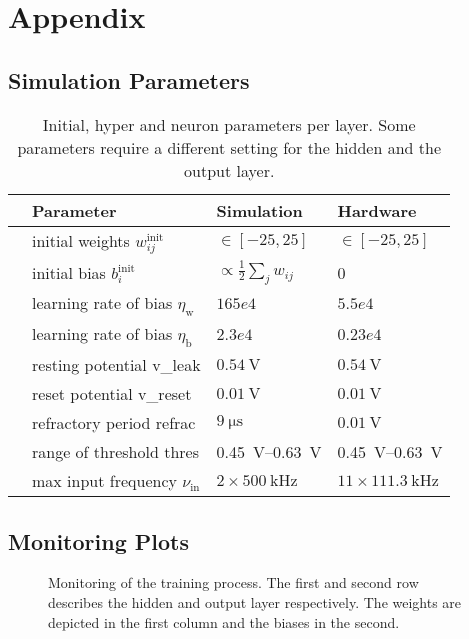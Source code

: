 \appendix
\chapter{Appendix}
\section{Simulation Parameters}
\begin{table}[h!]\centering{}
	\begin{tabular}{@{}rlll@{}}\toprule
		& Parameter								& 	Simulation 			& 	Hardware 	\\ \midrule
		& initial weights $w_{ij}^\text{init}$	& 	 $\in[-25, 25]$			&	$\in[-25, 25]$	\\
		& initial bias $b_{i}^\text{init}$		& $\propto \frac{1}{2} \sum_j w_{ij}$ &	0		\\
		& learning rate of bias  $\eta_\text{w}$&	$165e4$					& 	$5.5e4$			\\
		& learning rate of bias  $\eta_\text{b}$&	$2.3e4$					& 	$0.23e4$		\\
		& resting potential \gls{v_leak}		&	$\SI{0.54}{\V}$ 		& 	$\SI{0.54}{\V}$	\\
		& reset potential \gls{v_reset}			&	$\SI{0.01}{\V}$			& 	$\SI{0.01}{\V}$	\\
		& refractory period \gls{refrac}		&	$\SI{9}{\micro \s}$			& 	$\SI{0.01}{\V}$	\\
		& range of threshold \gls{thres} 				&	\SIrange{0.45}{0.63}{\V}&	\SIrange{0.45}{0.63}{\V}\\
		& max input frequency $\nu_{\text{in}}$	&	$2 \times \SI{500}{\kilo \Hz}$	& $11 \times \SI{111.3}{\kilo\Hz}$	\\
		\bottomrule
	\end{tabular}
	\caption[Initial, hyper and neuron parameters per layer.]{Initial, hyper and neuron parameters per layer. Some parameters require a different setting for the hidden and the output layer.}
	\label{hardwarevssimulationtable}
\end{table}

\section{Monitoring Plots}
\label{monitoringplots}
\begin{figure}[!htb]
	\centering
    
	\caption[Monitoring of the training process.]{Monitoring of the training process. The first and second row describes the hidden and output layer respectively. The weights are depicted in the first column and the biases in the second.}
	\label{network_monitoring}
\end{figure}